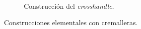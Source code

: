 \documentclass[10pt]{report}
\theoremstyle{definition}
\begin{document}
\begin{figure}
\begin{subfigure}{1\textwidth}
\caption{Construcción del \textit{crosshandle}.\label{fig:crosshandle}}
\end{subfigure}
\caption{Construcciones elementales con cremalleras.}
\end{figure}
\clearpage
%
%
%
%
%

\end{document}
